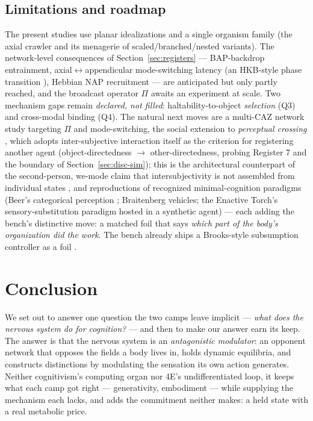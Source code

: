 \documentclass[utf8]{FrontiersinHarvard} %
\begin{document}
\subsection{Limitations and roadmap}\label{sec:disc-limits}
The present studies use planar idealizations and a single organism family (the axial crawler and its menagerie of scaled/branched/nested variants). The network-level consequences of Section~\ref{sec:registers} --- BAP-backdrop entrainment, axial$\leftrightarrow$appendicular mode-switching latency (an HKB-style phase transition \citep{HakenKelsoBunz1985}), Hebbian NAP recruitment --- are anticipated but only partly reached, and the broadcast operator $\Pi$ awaits an experiment at scale. Two mechanism gaps remain \emph{declared, not filled}: haltability-to-object \emph{selection} (Q3) and cross-modal binding (Q4). The natural next moves are a multi-CAZ network study targeting $\Pi$ and mode-switching, the social extension to \emph{perceptual crossing} \citep{Auvray2009PerceptualCrossing,FroeseDiPaolo2010PerceptualCrossing}, which adopts inter-subjective interaction itself as the criterion for registering another agent (object-directedness $\to$ other-directedness, probing Register 7 and the boundary of Section~\ref{sec:disc-sim}); this is the architectural counterpart of the second-person, we-mode claim that intersubjectivity is not assembled from individual states \citep{Gallagher2017Enactivist,gallagher2021action}, and reproductions of recognized minimal-cognition paradigms (Beer's categorical perception \citep{Beer2003}; Braitenberg vehicles; the Enactive Torch's sensory-substitution paradigm \citep{EstelleFroese2025EnactiveTorch} hosted in a synthetic agent) --- each adding the bench's distinctive move: a matched foil that says \emph{which part of the body's organization did the work}. The bench already ships a Brooks-style subsumption controller as a foil \citep{Brooks1991}.

\section{Conclusion}\label{sec:conclusion}

We set out to answer one question the two camps leave implicit --- \emph{what does the nervous system do for cognition?} --- and then to make our answer earn its keep. The answer is that the nervous system is an \emph{antagonistic modulator}: an opponent network that opposes the fields a body lives in, holds dynamic equilibria, and constructs distinctions by modulating the sensation its own action generates. Neither cognitivism's computing organ nor 4E's undifferentiated loop, it keeps what each camp got right --- generativity, embodiment --- while supplying the mechanism each lacks, and adds the commitment neither makes: a held state with a real metabolic price.
\end{document}
